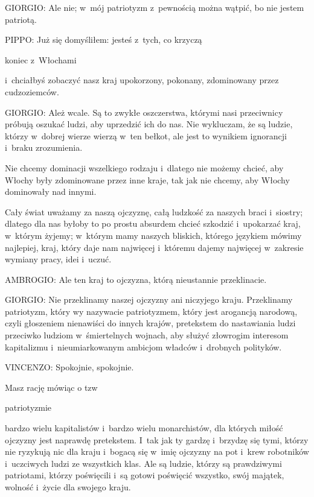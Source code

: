\documentclass[oneside,polish,11pt,sfheadings]{mwbk}
\begin{document}
 
\noindent GIORGIO: Ale nie; w~mój patriotyzm z~pewnością można wątpić, bo nie jestem patriotą. 




 
\noindent PIPPO: Już się domyśliłem: jesteś z~tych, co krzyczą \begin{itshape}koniec z~Włochami \end{itshape} i~chciałbyś zobaczyć nasz kraj upokorzony, pokonany, zdominowany przez
cudzoziemców. 




 
\noindent GIORGIO: Ależ wcale. Są to zwykłe oszczerstwa, którymi nasi przeciwnicy próbują oszukać ludzi, aby uprzedzić ich do nas.
Nie wykluczam, że są ludzie, którzy w~dobrej wierze wierzą w~ten bełkot, ale jest to wynikiem ignorancji i~braku
zrozumienia. 

 
Nie chcemy dominacji wszelkiego rodzaju i~dlatego nie możemy chcieć, aby Włochy były zdominowane przez inne kraje, tak
jak nie chcemy, aby Włochy dominowały nad innymi. 

 
Cały świat uważamy za naszą ojczyznę, całą ludzkość za naszych braci i~siostry; dlatego dla nas byłoby to po prostu
absurdem chcieć szkodzić i~upokarzać kraj, w~którym żyjemy; w~którym mamy naszych bliskich, którego językiem mówimy
najlepiej, kraj, który daje nam najwięcej i~któremu dajemy najwięcej w~zakresie wymiany pracy, idei i~uczuć. 




 
\noindent AMBROGIO: Ale ten kraj to ojczyzna, którą nieustannie przeklinacie. 




 
\noindent GIORGIO: Nie przeklinamy naszej ojczyzny ani niczyjego kraju. Przeklinamy patriotyzm, który wy nazywacie patriotyzmem,
który jest arogancją narodową, czyli głoszeniem nienawiści do innych krajów, pretekstem do nastawiania ludzi przeciwko
ludziom w~śmiertelnych wojnach, aby służyć złowrogim interesom kapitalizmu i~nieumiarkowanym ambicjom władców i~drobnych polityków. 




 
\noindent VINCENZO: Spokojnie, spokojnie. 

 
Masz rację mówiąc o tzw \begin{itshape}patriotyzmie  \end{itshape}bardzo wielu kapitalistów i~bardzo wielu monarchistów, dla których miłość ojczyzny jest naprawdę pretekstem. I~tak jak ty gardzę i~brzydzę się
tymi, którzy nie ryzykują nic dla kraju i~bogacą się w~imię ojczyzny na pot i~krew robotników i~uczciwych ludzi ze
wszystkich klas. Ale są ludzie, którzy są prawdziwymi patriotami, którzy poświęcili i~są gotowi poświęcić wszystko,
swój majątek, wolność i~życie dla swojego kraju. 
\end{document}
